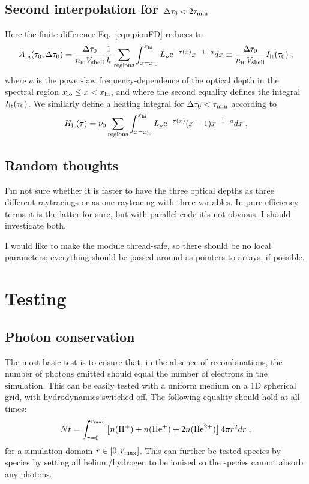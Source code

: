 \documentclass[a4paper,11pt]{article}
\begin{document}
\subsection{Second interpolation for $\Delta\tau_0<2\tau_{\mathrm{min}}$}
Here the finite-difference Eq.~\ref{eqn:pionFD} reduces to 
\begin{equation}
A_{\mathrm{pi}}(\tau_0,\Delta\tau_0) = 
    \frac{\Delta\tau_0}{n_{\textsc{hi}}V_{\mathrm{shell}}} 
    \frac{1}{h} \sum_{\mathrm{regions}}\int_{x=x_{\mathrm{lo}}}^{x_{\mathrm{hi}}}
    L_\nu \mathrm{e}^{-\tau(x)} x^{-1-a} dx
  \equiv \frac{\Delta\tau_0}{n_{\textsc{hi}}V_{\mathrm{shell}}} I_{\mathrm{lt}}(\tau_0) \;,
\label{eqn:pion_lowtau}
\end{equation}
where $a$ is the power-law frequency-dependence of the optical depth in the spectral region $x_{\mathrm{lo}}\leq x<x_{\mathrm{hi}}$, and where the second equality defines the integral $I_{\mathrm{lt}}(\tau_0)$.
We similarly define a heating integral for $\Delta\tau_0<\tau_{\mathrm{min}}$ according to
\begin{equation}
H_{\mathrm{lt}}(\tau) = \nu_0 \sum_{\mathrm{regions}}\int_{x=x_{\mathrm{lo}}}^{x_{\mathrm{hi}}}
    L_\nu \mathrm{e}^{-\tau(x)}(x-1)x^{-1-a} dx \;.
\label{eqn:pheat_lowtau}
\end{equation}




\subsection{Random thoughts}
I'm not sure whether it is faster to have the three optical depths as three different raytracings or as one raytracing with three variables.
In pure efficiency terms it is the latter for sure, but with parallel code it's not obvious.
I should investigate both.

I would like to make the module thread-safe, so there should be no local parameters; everything should be passed around as pointers to arrays, if possible.


\section{Testing}
\subsection{Photon conservation}
The most basic test is to ensure that, in the absence of recombinations, the number of photons emitted should equal the number of electrons in the simulation.
This can be easily tested with a uniform medium on a 1D spherical grid, with hydrodynamics switched off.
The following equality should hold at all times:
\begin{equation}
\dot{N} t = \int_{r=0}^{r_{\mathrm{max}}} \left[n(\mathrm{H}^+)+n(\mathrm{He}^+)+2n(\mathrm{He}^{2+})\right] 4\mathrm{\pi}r^2dr \;,
\end{equation}
for a simulation domain $r\in[0,r_{\mathrm{max}}]$.
This can further be tested species by species by setting all helium/hydrogen to be ionised so the species cannot absorb any photons.






\end{document}
